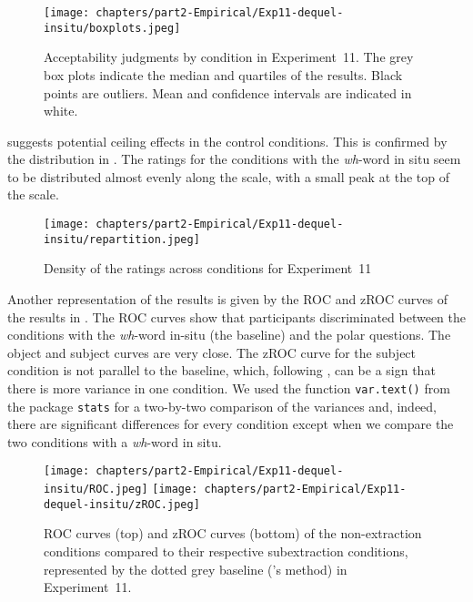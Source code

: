 \begin{figure}
    \centering
    \texttt{[image: chapters/part2-Empirical/Exp11-dequel-insitu/boxplots.jpeg]}
    \caption{Acceptability judgments by condition in Experiment~11. The grey box plots indicate the median and quartiles of the results. Black points are outliers. Mean and confidence intervals are indicated in white.}
    \label{fig:exp11-boxplot}
\end{figure}

 suggests potential ceiling effects in the control conditions. This is confirmed by the distribution in . The ratings for the conditions with the \emph{wh}-word in situ seem to be distributed almost evenly along the scale, with a small peak at the top of the scale. 

\begin{figure}
    \centering
    \texttt{[image: chapters/part2-Empirical/Exp11-dequel-insitu/repartition.jpeg]}
    \caption{Density of the ratings across conditions for Experiment~11}
    \label{fig:exp11-repartition}
\end{figure}

Another representation of the results is given by the ROC and zROC curves of the results in . The ROC curves show that participants discriminated between the conditions with the \emph{wh}-word in-situ (the baseline) and the polar questions. The object and subject curves are very close. The zROC curve for the subject condition is not parallel to the baseline, which, following \citet{Dillon.2019}, can be a sign that there is more variance in one condition. We used the function \texttt{var.text()} from the package \texttt{stats} \citep{R} for a two-by-two comparison of the variances and, indeed, there are significant differences for every condition except when we compare the two conditions with a \emph{wh}-word in situ. 

\begin{figure}
    \centering
    \texttt{[image: chapters/part2-Empirical/Exp11-dequel-insitu/ROC.jpeg]}
    \texttt{[image: chapters/part2-Empirical/Exp11-dequel-insitu/zROC.jpeg]}
    \caption{ROC curves (top) and zROC curves (bottom) of the non-extraction conditions compared to their respective subextraction conditions, represented by the dotted grey baseline (\citealt{Dillon.2019}'s method) in Experiment~11.}
    \label{fig:exp11-ROC}
\end{figure}

